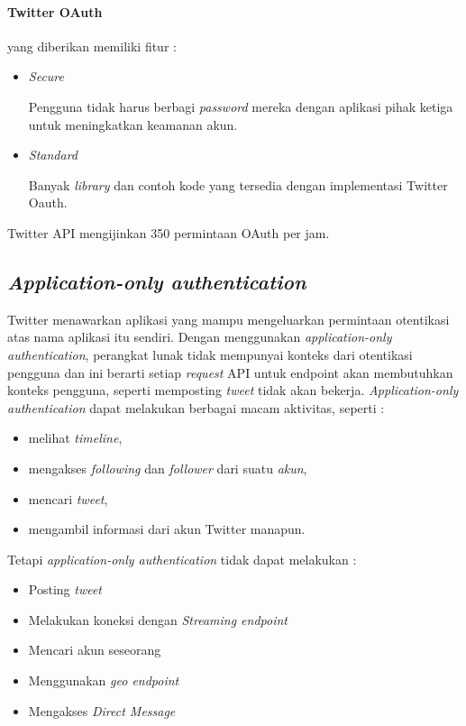 \paragraph{Twitter OAuth}yang diberikan memiliki fitur :
\begin{itemize}
	\item \textit{Secure}
	
	Pengguna tidak harus berbagi \textit{password} mereka dengan aplikasi pihak ketiga untuk meningkatkan keamanan akun.
	\item \textit{Standard}
	
	Banyak \textit{library} dan contoh kode yang tersedia dengan implementasi Twitter Oauth.
\end{itemize}

Twitter API mengijinkan 350 permintaan OAuth per jam.

\subsection{\textit{Application-only authentication}}
Twitter menawarkan aplikasi yang mampu mengeluarkan permintaan otentikasi atas nama aplikasi itu sendiri. Dengan menggunakan \textit{application-only authentication}, perangkat lunak tidak mempunyai konteks dari otentikasi pengguna dan ini berarti setiap \textit{request} API untuk endpoint akan membutuhkan konteks pengguna, seperti memposting \textit{tweet} tidak akan bekerja. \textit{Application-only authentication} dapat melakukan berbagai macam aktivitas, seperti : 

\begin{itemize}
	\item melihat \textit{timeline}, 
	\item mengakses \textit{following} dan \textit{follower} dari suatu \textit{akun},
	\item mencari \textit{tweet},
	\item mengambil informasi dari akun Twitter manapun.
\end{itemize}


Tetapi \textit{application-only authentication} tidak dapat melakukan :

\begin{itemize}
	\item Posting \textit{tweet}
	\item Melakukan koneksi dengan \textit{Streaming endpoint}
	\item Mencari akun seseorang
	\item Menggunakan \textit{geo endpoint}
	\item Mengakses \textit{Direct Message}
\end{itemize}


